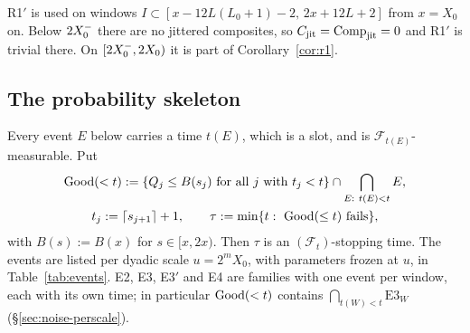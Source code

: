 \begin{remark}\label{rem:basescales}
R1$'$ is used on windows $I\subset[x-12L(L_0+1)-2,\,2x+12L+2]$ from $x=X_0$ on. Below $2X_0^{-}$ there are no jittered
composites, so $C_{\mathrm{jit}}=\operatorname{Comp}_{\mathrm{jit}}=0$ and R1$'$ is trivial there. On $[2X_0^{-},2X_0)$ it is part of Corollary~\ref{cor:r1}.
\end{remark}

\subsection{The probability skeleton}\label{sec:queue-skeleton}

\begin{definition}\label{def:good}
Every event $E$ below carries a time $t(E)$, which is a slot, and is $\mathcal F_{t(E)}$-measurable. Put
\begin{gather*}
\mathrm{Good}(<t):=\{Q_j\le B(s_j)\ \text{for all $j$ with $t_j<t$}\}\cap\bigcap_{E:\ t(E)<t}E,\\
t_j:=\lceil s_{j+1}\rceil+1,\qquad\tau:=\min\{t:\ \mathrm{Good}(\le t)\text{ fails}\},
\end{gather*}
with $B(s):=B(x)$ for $s\in[x,2x)$. Then $\tau$ is an $(\mathcal F_t)$-stopping time. The events are listed per dyadic scale
$u=2^mX_0$, with parameters frozen at $u$, in Table~\ref{tab:events}. E2, E3, E3$'$ and E4 are families with one event per window,
each with its own time; in particular $\mathrm{Good}(<t)$ contains $\bigcap_{t(W)<t}\mathrm{E3}_W$ (\S\ref{sec:noise-perscale}).
\end{definition}

